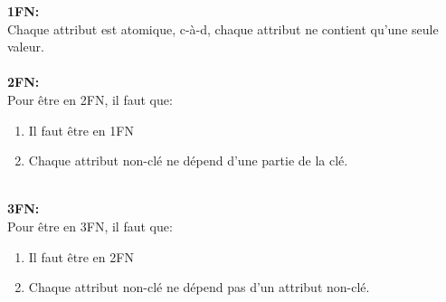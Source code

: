 \documentclass[french]{article}
\begin{document}
\begin{multicols*}{3}
{		\textbf{1FN:}\\
		Chaque attribut est atomique, c-à-d, chaque attribut ne contient qu'une seule valeur.\\
		\hline\\
		\vspace{8pt}
		\textbf{2FN:}\\
		Pour être en 2FN, il faut que:
		\begin{enumerate}
			\item Il faut être en 1FN
			\item Chaque attribut non-clé ne dépend d'une partie de la clé.
		\end{enumerate}
		\hline\\
		\vspace{8pt}
		\textbf{3FN:}\\
		Pour être en 3FN, il faut que:
		\begin{enumerate}
			\item Il faut être en 2FN
			\item Chaque attribut non-clé ne dépend pas d'un attribut
			      non-clé.
		\end{enumerate}
	}



\end{multicols*}
\end{document}
